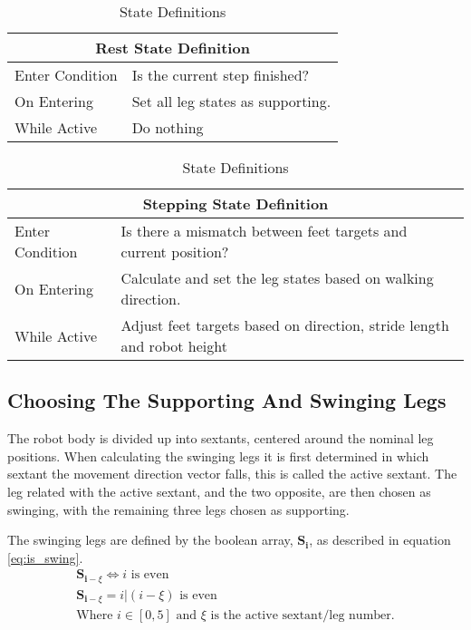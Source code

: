 \begin{table}[h]
    \center
    \begin{tabularx}{\textwidth}{|l|X|}
        \hline
        \multicolumn{2}{|c|}{Rest State Definition} \\
        \hline
        Enter Condition & Is the current step finished? \\
        \hline
        On Entering & Set all leg states as supporting. \\
        \hline
        While Active & Do nothing \\
        \hline
    \end{tabularx}
    
    \bigskip
    \noindent
    \begin{tabularx}{\textwidth}{|l|X|}
        \hline
        \multicolumn{2}{|c|}{Stepping State Definition} \\
        \hline
        Enter Condition & Is there a mismatch between feet targets and current position? \\
        \hline
        On Entering & Calculate and set the leg states based on walking direction. \\
        \hline
        While Active & Adjust feet targets based on direction, stride length and robot height\\
        \hline
    \end{tabularx}
    \caption{State Definitions}
    \label{tab:state_defs}
\end{table}

\newpage
\subsection{Choosing The Supporting And Swinging Legs} \label{sec:supp_swing_calc}
    The robot body is divided up into sextants, centered around the nominal leg positions. When calculating
    the swinging legs it is first determined in which sextant the movement direction vector falls, this is called the active sextant.
    The leg related with the active sextant, and the two opposite, are then chosen as swinging, with the remaining three legs chosen as supporting.

    The swinging legs are defined by the boolean array, \(\boldsymbol{S_i}\), as described in equation \ref{eq:is_swing}.
    \begin{equation}\label{eq:is_swing}
        \begin{gathered}
            \boldsymbol{S}_{\boldsymbol{i} - \xi} \iff i \text{ is even} \\
            \boldsymbol{S}_{\boldsymbol{i} - \xi}={i|(i-\xi) \text{ is even}} \\
            \text{Where \(i \in [0,5]\) and \(\xi\) is the active sextant/leg number.}
        \end{gathered}
    \end{equation}

